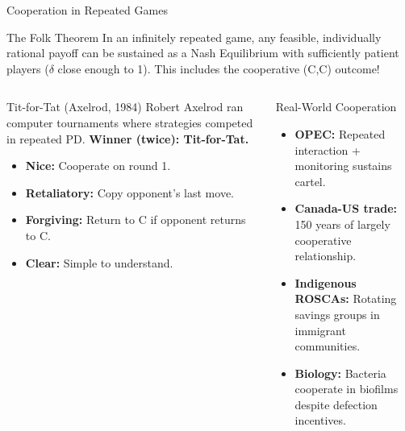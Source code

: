 \documentclass[aspectratio=169]{beamer}
\begin{document}
\begin{frame}{Cooperation in Repeated Games}
\begin{block}{The Folk Theorem}
In an infinitely repeated game, any feasible, individually rational payoff can be sustained as a Nash Equilibrium with sufficiently patient players ($\delta$ close enough to 1). This includes the cooperative (C,C) outcome!
\end{block}
\begin{columns}
\begin{exampleblock}{Tit-for-Tat (Axelrod, 1984)}
Robert Axelrod ran computer tournaments where strategies competed in repeated PD. \textbf{Winner (twice): Tit-for-Tat.}
\begin{itemize}
  \item \textbf{Nice:} Cooperate on round 1.
  \item \textbf{Retaliatory:} Copy opponent's last move.
  \item \textbf{Forgiving:} Return to C if opponent returns to C.
  \item \textbf{Clear:} Simple to understand.
\end{itemize}
\end{exampleblock}
\begin{block}{Real-World Cooperation}
\begin{itemize}
  \item \textbf{OPEC:} Repeated interaction + monitoring sustains cartel.
  \item \textbf{Canada-US trade:} 150 years of largely cooperative relationship.
  \item \textbf{Indigenous ROSCAs:} Rotating savings groups in immigrant communities.
  \item \textbf{Biology:} Bacteria cooperate in biofilms despite defection incentives.
\end{itemize}
\end{block}
\end{columns}
\end{frame}
\end{document}

